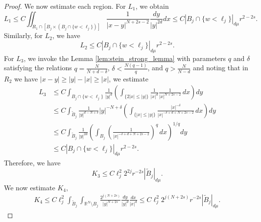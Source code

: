 \documentclass[11pt]{article}
\newcommand{\de} {\delta}
\newcommand{\rnn}{\mathbb{R}^{N}}
\begin{document}
\begin{proof}
We now estimate each region. For \( L_1 \), we obtain
\begin{equation*}
L_1 \leq C \iint_{R_1 \cap [B_j \times (B_j \cap \{ w < \ell_j \})]} \frac{1}{|x - y|^{N + 2s - 2}}   \frac{dy}{|y|^{2d}}   dx
\leq C | B_j \cap \{ w < \ell_j \} |_{d\mu}   r^{2 - 2s}.
\end{equation*}
Similarly, for \( L_2 \), we have
\begin{equation*}
L_2 \leq C |B_j \cap \{ w < \ell_j \} |_{d\mu}   r^{2 - 2s}.
\end{equation*}
For \( L_3 \), we invoke the Lemma \ref{lem:stein_strong_lemma} with parameters \( q \) and \( \de \) satisfying the relations $q = \frac{N}{N+d - \delta}$, $ \delta < \frac{N(q-1)}{q}$, and $q > \frac{N}{N-d}$ and noting that in $R_2$ we have $|x-y| \geq |y| - |x| \geq |x|$, we estimate
\begin{align*} 
L_3 &\leq C \int_{B_j \cap \{ w < \ell_j \}} \frac{1}{|y|^{d}} 
\left( \int_{\{ 2|x| \leq |y| \}} \frac{1}{|x|^{d}}   \frac{1}{|x |^{N + 2s - 2}} \, dx \right) dy\\
& \leq C \int_{\widetilde{B}_j} \frac{1}{|y|^{d - N + \delta}} |y|^{-N+\delta}
\left( \int_{ \{|x| \leq |y|\} } \frac{|x|^{-\delta}}{|x |^{- \delta + d+ N + 2s - 2}} \, dx \right) dy\\
& \leq C \int_{\widetilde{B}_j} \frac{1}{|y|^{2d}} 
\left( \int_{B_j} \left( \frac{1}{|x|^{- \delta + d + N + 2s - 2}} \right)^q \, dx \right)^{1/q} dy\\
& \leq C \left| B_j \cap \{ w < \ell_j \} \right|_{d\mu}   r^{2 - 2s}.
\end{align*}
Therefore, we have 
\begin{equation*}
    K_3 \leq C \ell_j^2   2^{2j}   r^{-2s} |\widetilde{B}_j|_{d\mu}.
\end{equation*}
We now estimate $K_4$,
\begin{align*}
K_4 
\leq C \ell_j^2 \int_{\widetilde{B}_j} \int_{\rnn \setminus B_j} 
\frac{2^{j(N+2s)}}{|y|^{N+2s}}   
\frac{dy}{|y|^{d}}   \frac{dx}{|x|^{d}}
\leq C \ell_j^2   2^{j(N+2s)}   r^{-2s} \left| \widetilde{B}_j \right|_{d\mu}.
\end{align*}




\end{proof}
\end{document}
